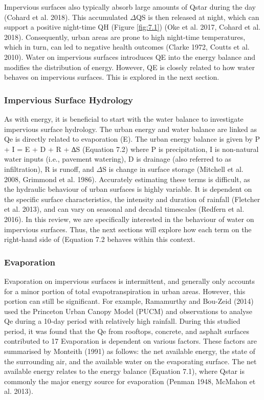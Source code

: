 \documentclass[final,3p,times,authoryear]{elsarticle}
\begin{document}
Impervious surfaces also typically absorb large amounts of \gls{Qstar} during the day (Cohard
et al. 2018). This accumulated $\Delta$QS is then released at night, which can support a
positive night-time QH (Figure \ref{fig:7.1}) (Oke et al. 2017, Cohard et al. 2018).
Consequently, urban areas are prone to high night-time temperatures, which in turn, can
led to negative health outcomes (Clarke 1972, Coutts et al. 2010).
Water on impervious surfaces introduces QE into the energy balance and modifies the
distribution of energy. However, QE is closely related to how water behaves on
impervious surfaces. This is explored in the next section.

\subsubsection{Impervious Surface Hydrology}\label{sec:appendix7.1.3}
As with energy, it is beneficial to start with the water balance to investigate impervious
surface hydrology. The urban energy and water balance are linked as \gls{Qe} is directly
related to evaporation (E). The urban energy balance is given by
P + I = E + D + R + ∆S
(Equation 7.2)
where P is precipitation, I is non-natural water inputs (i.e., pavement watering), D is
drainage (also referred to as infiltration), R is runoff, and $\Delta$S is change in surface storage
(Mitchell et al. 2008, Grimmond et al. 1986).
Accurately estimating these terms is difficult, as the hydraulic behaviour of urban
surfaces is highly variable. It is dependent on the specific surface characteristics, the intensity and duration of rainfall (Fletcher et al. 2013), and can vary on seasonal and
decadal timescales (Redfern et al. 2016).
In this review, we are specifically interested in the behaviour of water on impervious
surfaces. Thus, the next sections will explore how each term on the right-hand side of
(Equation 7.2 behaves within this context.

\subsubsection{Evaporation}\label{sec:appendix7.1.3.1}


Evaporation on impervious surfaces is intermittent, and generally only accounts for a
minor portion of total evapotranspiration in urban areas. However, this portion can still
be significant. For example, Ramamurthy and Bou-Zeid (2014) used the Princeton
Urban Canopy Model (PUCM) and observations to analyse \gls{Qe} during a 10-day period
with relatively high rainfall. During this studied period, it was found that the \gls{Qe} from
rooftops, concrete, and asphalt surfaces contributed to 17%
Evaporation is dependent on various factors. These factors are summarised by Monteith
(1991) as follows: the net available energy, the state of the surrounding air, and the
available water on the evaporating surface.
The net available energy relates to the energy balance (Equation 7.1), where \gls{Qstar} is
commonly the major energy source for evaporation (Penman 1948, McMahon et al.
2013).
\end{document}
